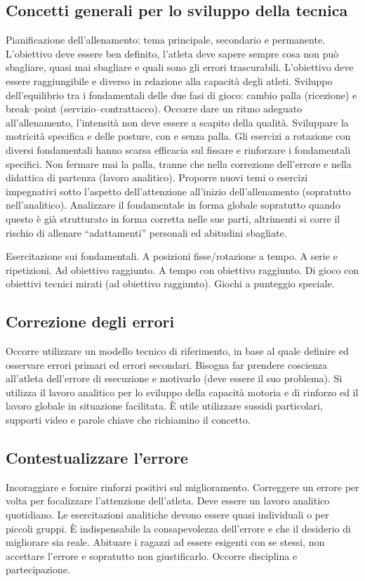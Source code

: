 \subsection{Concetti generali per lo sviluppo della tecnica}
Pianificazione dell'allenamento: tema principale, secondario e permanente. L'obiettivo deve essere ben definito, l'atleta deve sapere sempre cosa non può sbagliare, quasi mai sbagliare e quali sono gli errori trascurabili. L'obiettivo deve essere raggiungibile e diverso in relazione alla capacità degli atleti.
Sviluppo dell'equilibrio  tra i fondamentali delle due fasi di gioco: cambio palla (ricezione) e break--point (servizio--contrattacco).
Occorre dare un ritmo adeguato all'allenamento, l'intensità non deve essere a scapito della qualità. Sviluppare la motricità specifica e delle posture, con e senza palla.
Gli esercizi a rotazione con diversi fondamentali hanno scarsa efficacia sul fissare e rinforzare i fondamentali specifici. Non fermare mai la palla, tranne che nella correzione dell'errore e nella didattica di partenza (lavoro analitico).
Proporre nuovi temi o esercizi impegnativi sotto l'aspetto dell'attenzione all'inizio dell'allenamento (sopratutto nell'analitico).
Analizzare il fondamentale in forma globale sopratutto quando questo è già strutturato in forma corretta nelle sue parti, altrimenti si corre il rischio di allenare “adattamenti” personali
ed abitudini sbagliate.

Esercitazione sui fondamentali.
A posizioni fisse/rotazione a tempo.
A serie e ripetizioni.
Ad obiettivo raggiunto.
A tempo con obiettivo raggiunto.
Di gioco con obiettivi tecnici mirati (ad obiettivo raggiunto).
Giochi a punteggio speciale.

\subsection{Correzione degli errori}
Occorre utilizzare un modello tecnico di riferimento, in base al quale definire ed osservare errori primari ed errori secondari. Bisogna far prendere coscienza all'atleta dell'errore di esecuzione e motivarlo (deve essere il suo problema). Si utilizza il lavoro analitico per lo sviluppo della capacità motoria e di rinforzo ed il lavoro globale in situazione facilitata.
\`E utile utilizzare sussidi particolari, supporti video e parole chiave che richiamino il concetto.

\subsection{Contestualizzare l'errore}
Incoraggiare e fornire rinforzi positivi sul miglioramento. Correggere un errore per volta per focalizzare l'attenzione dell'atleta. Deve essere un lavoro analitico quotidiano.
Le esercitazioni analitiche devono essere quasi individuali o per piccoli gruppi.
\`E indispensabile la consapevolezza dell'errore e che il desiderio di migliorare sia reale.
Abituare i ragazzi ad essere esigenti con se stessi, non accettare l'errore e sopratutto non giustificarlo. Occorre disciplina e partecipazione.

